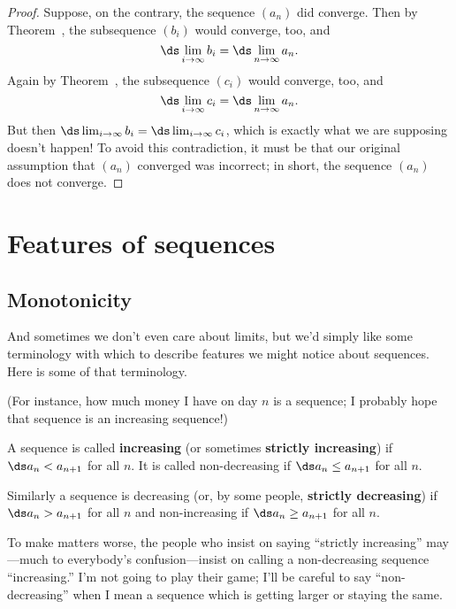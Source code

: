 \documentclass{ximera}
\newcommand{\defnword}[1]{\textbf{#1}}
\renewcommand{\index}[1]{}
\begin{document}
\begin{proof}
  Suppose, on the contrary, the sequence $(a_n)$ did converge.  Then
  by Theorem~, the subsequence
  $(b_i)$ would converge, too, and
  $$
  \ds\lim_{i \to \infty} b_i = \ds\lim_{n \to \infty} a_n.
  $$
  Again by Theorem~, the subsequence
  $(c_i)$ would converge, too, and
  $$
  \ds\lim_{i \to \infty} c_i = \ds\lim_{n \to \infty} a_n.
  $$
  But then $\ds\lim_{i \to \infty} b_i = \ds\lim_{i \to \infty} c_i$,
  which is exactly what we are supposing doesn't happen!  To avoid
  this contradiction, it must be that our original assumption that
  $(a_n)$ converged was incorrect; in short, the sequence $(a_n)$ does
  not converge.
\end{proof}


\section{Features of sequences}

\subsection{Monotonicity}

And sometimes we don't even care about limits, but we'd simply like
some terminology with which to describe features we might notice about
sequences.  Here is some of that terminology.

(For instance, how much money I have on day $n$ is a sequence; I
probably hope that sequence is an increasing sequence!)

\begin{definition}
  A sequence is called
  \defnword{increasing}\index{sequence!increasing} (or sometimes
  \defnword{strictly increasing}) if $\ds a_n<a_{n+1}$ for all $n$.
  It is called {\dfont
    non-decreasing\index{sequence!non-decreasing}\/} if $\ds a_n\le
  a_{n+1}$ for all $n$.

  Similarly a sequence is {\dfont
    decreasing\index{sequence!decreasing}\/} (or, by some people,
  \defnword{strictly decreasing}) if $\ds a_n>a_{n+1}$ for all $n$ and
  {\dfont non-increasing\index{sequence!non-increasing}\/} if $\ds
  a_n\ge a_{n+1}$ for all $n$.
\end{definition}
To make matters worse, the people who insist on saying ``strictly
increasing'' may---much to everybody's confusion---insist on calling a
non-decreasing sequence ``increasing.'' I'm not going to play their
game; I'll be careful to say ``non-decreasing'' when I mean a sequence
which is getting larger or staying the same.
\end{document}

